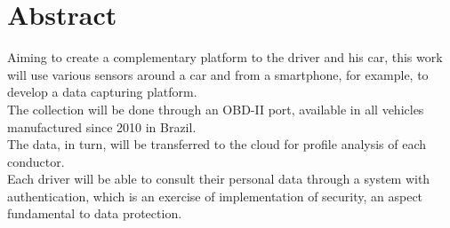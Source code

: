 \chapter*{Abstract}


\noindent Aiming to create a complementary platform to the driver and his car, this work will use various sensors around a car and from a smartphone, for example, to develop a data capturing platform. \\
The collection will be done through an OBD-II port, available in all vehicles manufactured since 2010 in Brazil. \\
The data, in turn, will be transferred to the cloud for profile analysis of each conductor. \\
Each driver will be able to consult their personal data through a system with authentication, which is an exercise of implementation of security, an aspect fundamental to data protection.